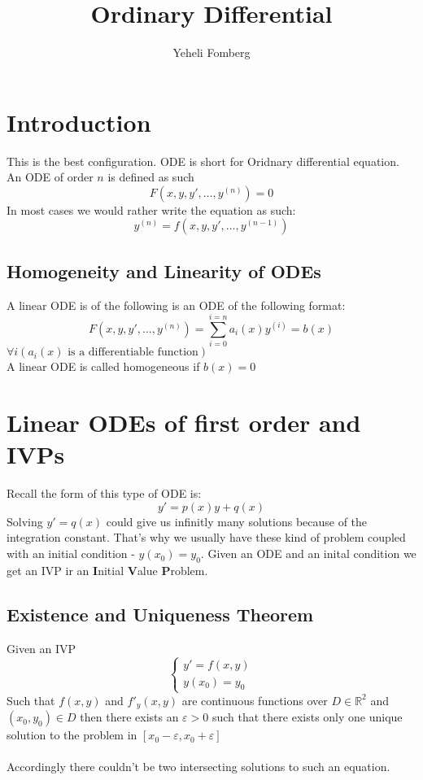 \documentclass{article}
\title{\textbf{Ordinary Differential}}
\author{Yeheli Fomberg}
\date{}
\newcommand{\R}{\mathbb{R}}
\begin{document}
	\maketitle
	\newpage
	\tableofcontents
	\newpage
	\section{Introduction}
  This is the best configuration.	
	ODE is short for Oridnary differential equation.	An ODE of order $n$ is defined as such
	\[
		F(x,y,y',\ldots,y^{(n)})=0
	\]
	In most cases we would rather write the equation as such:
	\[
		y^{(n)}=f(x,y,y',\ldots,y^{(n-1)})
	\]
	\subsection{Homogeneity and Linearity of ODEs}
	A linear ODE is of the following is an ODE of the following format:
	\[
		F(x,y,y',\ldots,y^{(n)})=\sum_{i=0}^{i=n}{a_i(x)y^{(i)}}=b(x)
	\]
	$\forall i(a_i(x)\text{ is a differentiable function})$
	\\ A linear ODE is called homogeneous if $b(x)=0$	
	
	\newpage
	\section{Linear ODEs of first order and IVPs}
	Recall the form of this type of ODE is:
	\[
		y'=p(x)y+q(x)
	\]
	Solving $y'=q(x)$ could give us infinitly many solutions because of the integration constant. That's why we usually have these kind of problem coupled with an initial condition - $y(x_0)=y_0$. Given an ODE and an inital condition we get an IVP ir an \textbf{I}nitial \textbf{V}alue \textbf{P}roblem.
	\subsection{Existence and Uniqueness Theorem}
	Given an IVP
	\begin{equation}
    \begin{cases}
    y'=f(x,y) \\
    y(x_0)=y_0
    \end{cases}
	\end{equation}
	Such that $f(x,y)$ and $f'_y(x,y)$ are continuous functions over $D\in\R^2$ and $(x_0,y_0)\in D$ then there exists an $\varepsilon>0$ such that there exists only one unique solution to the problem in $[x_0-\varepsilon,x_0+\varepsilon]$ \\
	\\
	Accordingly there couldn't be two intersecting solutions to such an equation.
\end{document}
